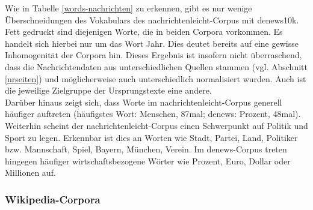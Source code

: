 \documentclass[11pt, a4paper]{article}
\begin{document}
Wie in Tabelle \ref{words-nachrichten} zu erkennen, gibt es nur wenige Überschneidungen des Vokabulars des nachrichtenleicht-Corpus mit denews10k.
Fett gedruckt sind diejenigen Worte, die in beiden Corpora vorkommen.
Es handelt sich hierbei nur um das Wort Jahr.
Dies deutet bereits auf eine gewisse Inhomogenität der Corpora hin.
Dieses Ergebnis ist insofern nicht überraschend, dass die Nachrichtendaten aus unterschiedlichen Quellen stammen (vgl. Abschnitt \ref{nrseiten}) und möglicherweise auch unterschiedlich normalisiert wurden.
Auch ist die jeweilige Zielgruppe der Ursprungstexte eine andere.\\
Darüber hinaus zeigt sich, dass Worte im nachrichtenleicht-Corpus generell häufiger auftreten (häufigstes Wort: Menschen, 87mal; denews: Prozent, 48mal).\\
Weiterhin scheint der nachrichtenleicht-Corpus einen Schwerpunkt auf Politik und Sport zu legen.
Erkennbar ist dies an Worten wie Stadt, Partei, Land, Politiker bzw. Mannschaft, Spiel, Bayern, München, Verein.
Im denews-Corpus treten hingegen häufiger wirtschaftsbezogene Wörter wie Prozent, Euro, Dollar oder Millionen auf.


\subsubsection{Wikipedia-Corpora}
\end{document}
